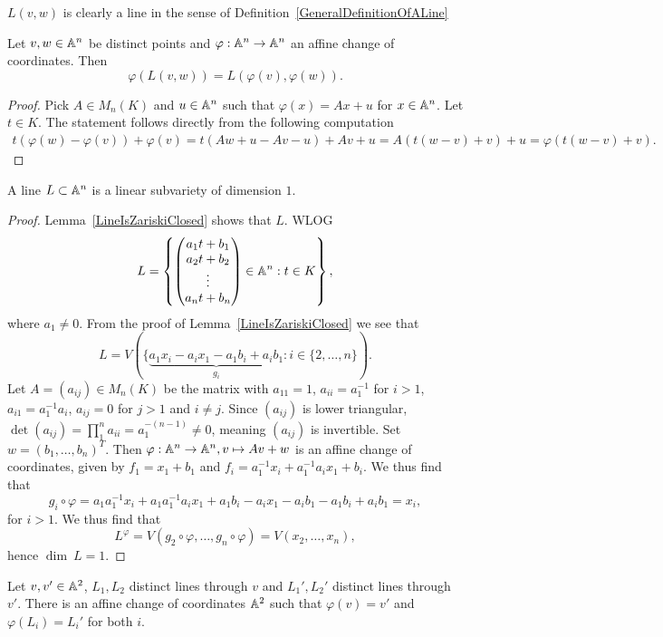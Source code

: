 \begin{remark}
    $L(v,w)$ is clearly a line in the sense of Definition~\ref{GeneralDefinitionOfALine}
\end{remark}
\begin{lemma}\label{ChangeOfCoordinatesOfLine}
    Let $v,w\in\mathbb{A}^n$ be distinct points and $\varphi:\mathbb{A}^n\rightarrow\mathbb{A}^n$ an affine change of coordinates. Then $$\varphi(L(v,w))=L(\varphi(v),\varphi(w)).$$
\end{lemma}
\begin{proof}
    Pick $A\in M_n(K)$ and $u\in \mathbb{A}^n$ such that $\varphi(x) = Ax+u$ for $x\in \mathbb{A}^n$. Let $t\in K$. The statement follows directly from the following computation
    \begin{align*}
        t(\varphi(w)-\varphi(v))+\varphi(v)= t(Aw+u-Av-u)+Av+u = A(t(w-v)+v)+u=\varphi(t(w-v)+v).
    \end{align*}
\end{proof}
\begin{lemma}\label{LineIsOneDimensional}
    A line $L\subset \mathbb{A}^n$ is a linear subvariety of dimension $1$.
\end{lemma}
\begin{proof}
    Lemma~\ref{LineIsZariskiClosed} shows that $L$. WLOG 
    $$L=\left\{ \begin{pmatrix} a_1t+b_1\\ a_2t+b_2\\ \vdots \\ a_nt+b_n \end{pmatrix}\in\mathbb{A}^n : t \in K \right\},$$
    where $a_1\neq0$.
    From the proof of Lemma~\ref{LineIsZariskiClosed} we see that 
    $$L= V(\{\underbrace{a_1x_i - a_ix_1-a_1b_i+a_ib_1}_{g_i} : i\in\{2,\dots,n\}).$$
    Let $A=(a_{ij})\in M_n(K)$ be the matrix with $a_{11}=1$, $a_{ii} = a_1^{-1}$ for $i>1$, $a_{i1}=a_1^{-1}a_i$, $a_{ij}=0$ for $j>1$ and $i\neq j$. Since $(a_{ij})$ is lower triangular, $\det (a_{ij})=\prod_1^n a_{ii}=a_1^{-(n-1)}\neq 0$, meaning $(a_{ij})$ is invertible. Set $w = (b_1,\dots,b_n)^T$. Then $\varphi: \mathbb{A}^n \rightarrow \mathbb{A}^n, v\mapsto Av+w$ is an affine change of coordinates, given by $f_1=x_1+b_1$ and $f_i = a_1^{-1}x_i+a_1^{-1}a_ix_1+b_i$. We thus find that 
    $$g_i\circ \varphi = a_1a_1^{-1}x_i+a_1a_1^{-1}a_ix_1+a_1b_i-a_ix_1-a_ib_1-a_1b_i+a_ib_1 = x_i,$$
    for $i>1$. We thus find that 
    $$L^\varphi = V(g_2\circ \varphi ,\dots, g_n\circ \varphi)= V(x_2,\dots,x_n),$$
    hence $\dim \ L = 1$.
\end{proof}
\begin{proposition}
    Let $v,v'\in\mathbb{A}^2$, $L_1,L_2$ distinct lines through $v$ and $L_1',L_2'$ distinct lines through $v'$. There is an affine change of coordinates $\mathbb{A}^2$ such that $\varphi(v)=v'$ and $\varphi(L_i)=L_i'$ for both $i$.
\end{proposition}
